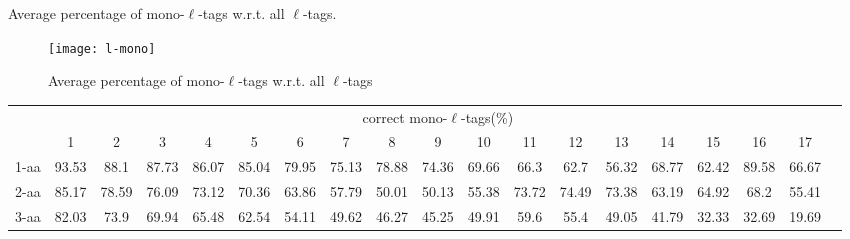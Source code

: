 \documentclass{article}[12pt]
\begin{document}
\begin{landscape}
\begin{table}[h]
\caption{ Average percentage of mono-$\ell$-tags w.r.t. all $\ell$-tags.}
\label{table:l-mono}

\vspace{3mm}
\end{table}
\end{landscape}

\begin{figure}
  \begin{center}
\texttt{[image: l-mono]}
\end{center}
\caption{Average percentage of mono-$\ell$-tags w.r.t. all $\ell$-tags}
  \label{fig:l-mono}
\end{figure}


\begin{landscape}

\begin{table}[h]\tiny
\vspace{3mm}
{\centering
\begin{center}
\begin{tabular}{|l|c|c|c|c|c|c|c|c|c|c|c|c|c|c|c|c|c|c|}
  \hline
  & \multicolumn{ 17 }{|c|}{correct mono-$\ell$-tags(\%)} \\
  \cline{2- 18}
    & 1 & 2 & 3 & 4 & 5 & 6 & 7 & 8 & 9 & 10 & 11 & 12 & 13 & 14 & 15 & 16 & 17\\
  \hline
1-aa  & 93.53 & 88.1 & 87.73 & 86.07 & 85.04 & 79.95 & 75.13 & 78.88 & 74.36 & 69.66 & 66.3 & 62.7 & 56.32 & 68.77 & 62.42 & 89.58 & 66.67\\
2-aa  & 85.17 & 78.59 & 76.09 & 73.12 & 70.36 & 63.86 & 57.79 & 50.01 & 50.13 & 55.38 & 73.72 & 74.49 & 73.38 & 63.19 & 64.92 & 68.2 & 55.41\\
3-aa  & 82.03 & 73.9 & 69.94 & 65.48 & 62.54 & 54.11 & 49.62 & 46.27 & 45.25 & 49.91 & 59.6 & 55.4 & 49.05 & 41.79 & 32.33 & 32.69 & 19.69\\
 \hline
\end{tabular}
\end{center}
\par}
\centering


\end{table}
\end{landscape}
\end{document}
